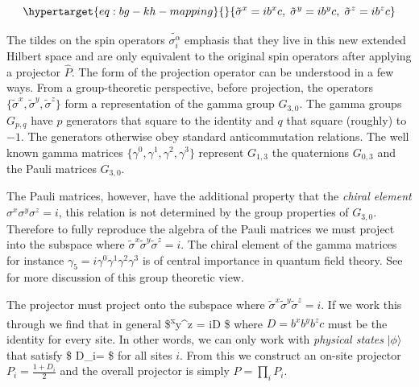 \begin{equation}\protect\hypertarget{eq:bg-kh-mapping}{}{\tilde{\sigma}^x = i b^x c,\; \tilde{\sigma}^y = i b^y c,\; \tilde{\sigma}^z = i b^z c}\label{eq:bg-kh-mapping}\end{equation}

The tildes on the spin operators \(\tilde{\sigma_i^\alpha}\) emphasis that they live in this new extended Hilbert space and are only equivalent to the original spin operators after applying a projector \(\hat{P}\). The form of the projection operator can be understood in a few ways. From a group-theoretic perspective, before projection, the operators \(\{\tilde{\sigma}^x, \tilde{\sigma}^y, \tilde{\sigma}^z\}\) form a representation of the gamma group \(G_{3,0}\). The gamma groups \(G_{p,q}\) have \(p\) generators that square to the identity and \(q\) that square (roughly) to \(-1\). The generators otherwise obey standard anticommutation relations. The well known gamma matrices \(\{\gamma^0, \gamma^1, \gamma^2, \gamma^3\}\) represent \(G_{1,3}\) the quaternions \(G_{0,3}\) and the Pauli matrices \(G_{3,0}\).

The Pauli matrices, however, have the additional property that the \emph{chiral element} \(\sigma^x \sigma^y \sigma^z = i\), this relation is not determined by the group properties of \(G_{3,0}\). Therefore to fully reproduce the algebra of the Pauli matrices we must project into the subspace where \(\tilde{\sigma}^x \tilde{\sigma}^y \tilde{\sigma}^z = i\). The chiral element of the gamma matrices for instance \(\gamma_5 = i\gamma^0 \gamma^1 \gamma^2 \gamma^3\) is of central importance in quantum field theory. See~\autocite{petitjeanChiralityDiracSpinors2020} for more discussion of this group theoretic view.

The projector must project onto the subspace where \(\tilde{\sigma}^x \tilde{\sigma}^y \tilde{\sigma}^z = i\). If we work this through we find that in general \$\tilde{\sigma}\textsuperscript{x\tilde{\sigma}}y\tilde{\sigma}\^{}z = iD \$ where \(D = b^x b^y b^z c\) must be the identity for every site. In other words, we can only work with \emph{physical states} \(|\phi\rangle\) that satisfy \$ D\_i\textbar{}\phi\rangle = \textbar{}\phi\rangle\$ for all sites \(i\). From this we construct an on-site projector \(P_i = \frac{1 + D_i}{2}\) and the overall projector is simply \(P = \prod_i P_i\).

